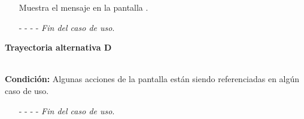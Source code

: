 \begin{enumerate}
	\UCpaso[\UCsist] Muestra el mensaje  en la pantalla .
	\item[- -] - - {\em {Fin del caso de uso}}.
\end{enumerate}
\hypertarget{CU11-3:TAD}{\textbf{Trayectoria alternativa D}}\\
\noindent \textbf{Condición:} Algunas acciones de la pantalla están siendo referenciadas en algún caso de uso.
\begin{enumerate}
	\UCpaso[\UCsist] Muestra el mensaje  en la pantalla .
	\item[- -] - - {\em {Fin del caso de uso}}.
\end{enumerate}
	

